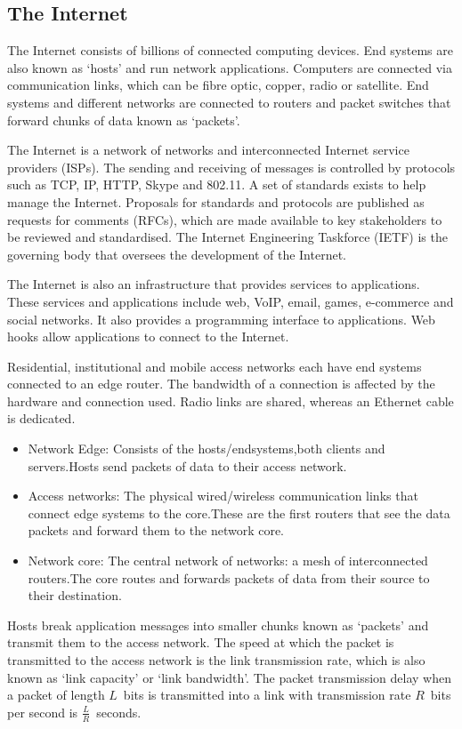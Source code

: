 \subsection{The Internet}

The Internet consists of billions of connected computing devices.
End systems are also known as `hosts' and run network applications.
Computers are connected via communication links, which can be fibre optic, copper, radio or satellite.
End systems and different networks are connected to routers and packet switches that forward chunks of data known as `packets'.

The Internet is a network of networks and interconnected Internet service providers (ISPs).
The sending and receiving of messages is controlled by protocols such as TCP, IP, HTTP, Skype and 802.11.
A set of standards exists to help manage the Internet.
Proposals for standards and protocols are published as requests for comments (RFCs), which are made available to key stakeholders to be reviewed and standardised.
The Internet Engineering Taskforce (IETF) is the governing body that oversees the development of the Internet.

The Internet is also an infrastructure that provides services to applications.
These services and applications include web, VoIP, email, games, e-commerce and social networks.
It also provides a programming interface to applications.
Web hooks allow applications to connect to the Internet.

Residential, institutional and mobile access networks each have end systems connected to an edge router.
The bandwidth of a connection is affected by the hardware and connection used.
Radio links are shared, whereas an Ethernet cable is dedicated.
\begin{itemize}
  \item Network Edge:
  \newline
  Consists of the hosts/endsystems,both clients and servers.Hosts send packets of data to their access network.
  \item Access networks:
  \newline
  The physical wired/wireless communication links that connect edge systems to the core.These are the first routers that see the data packets and forward them to the network core.
  \item Network core: 
  \newline
  The central network of networks: a mesh of interconnected routers.The core routes and forwards packets of data from their source to their destination.
\end{itemize}
Hosts break application messages into smaller chunks known as `packets' and transmit them to the access network.
The speed at which the packet is transmitted to the access network is the link transmission rate, which is also known as `link capacity' or `link bandwidth'.
The packet transmission delay when a packet of length \( L \)~bits is transmitted into a link with transmission rate \( R \)~bits per second is \( \frac{L}{R} \)~seconds.

